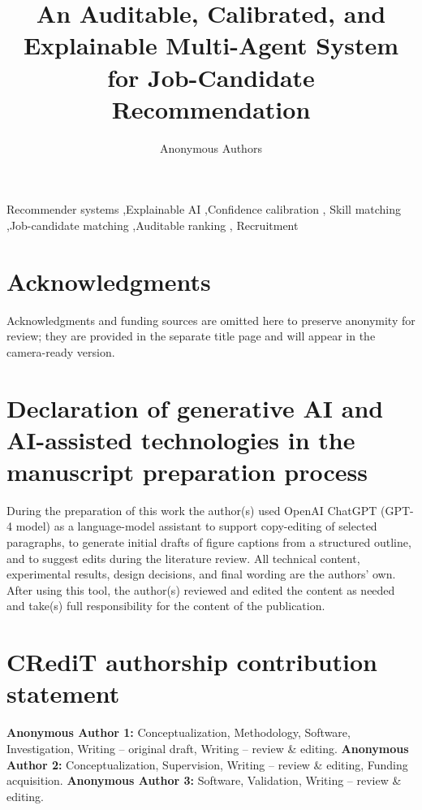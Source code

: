 \documentclass[preprint,review,3p,times,twocolumn,authoryear]{elsarticle}
\title{An Auditable, Calibrated, and Explainable Multi-Agent System for
       Job-Candidate Recommendation}
\author[anonymous]{Anonymous Authors}
\begin{document}
\begin{abstract}

\end{abstract}

\begin{keyword}
Recommender systems \sep Explainable AI \sep Confidence calibration \sep
Skill matching \sep Job-candidate matching \sep Auditable ranking \sep
Recruitment
\end{keyword}

\maketitle










\section*{Acknowledgments}
Acknowledgments and funding sources are omitted here to preserve anonymity for
review; they are provided in the separate title page and will appear in the
camera-ready version.

\section*{Declaration of generative AI and AI-assisted technologies
in the manuscript preparation process}
During the preparation of this work the author(s) used OpenAI
ChatGPT (GPT-4 model) as a language-model assistant to support
copy-editing of selected paragraphs, to generate initial drafts of
figure captions from a structured outline, and to suggest edits
during the literature review. All technical content, experimental
results, design decisions, and final wording are the authors' own.
After using this tool, the author(s) reviewed and edited the content
as needed and take(s) full responsibility for the content of the
publication.

\section*{CRediT authorship contribution statement}
\textbf{Anonymous Author 1:} Conceptualization, Methodology, Software,
Investigation, Writing -- original draft, Writing -- review \& editing.
\textbf{Anonymous Author 2:} Conceptualization, Supervision, Writing --
review \& editing, Funding acquisition.
\textbf{Anonymous Author 3:} Software, Validation, Writing -- review \&
editing.
\end{document}
